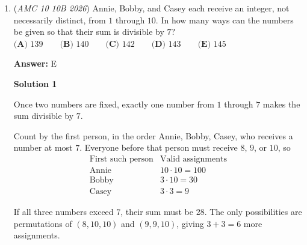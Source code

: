 \begin{enumerate}
 
Case 2: Ben goes first

 Note how the $r$ value would stay the same, because the same thing needs to happen -- Ben fails his $n$th draw, and Anika fails her $n + 1$th draw, so $r = \dfrac{6}{25}$. However, this time, the probability Ben wins immediately or $a$ is $\dfrac{2}{5}$. Using the infinite geometric series, we get that $B = \dfrac{10}{19}$Lastly, $B - A = \dfrac{10}{19} - \dfrac{4}{19} = \boxed{\dfrac{6}{19}} = \boxed{D}$ 

 -- aditya.a

 \textbf{Similar Problems} \href{https://artofproblemsolving.com/wiki/index.php?title=1981\_AHSME\_Problems/Problem\_26}{1981 AHSME \#26}

 \href{https://artofproblemsolving.com/wiki/index.php?title=2015\_AMC\_12B\_Problems/Problem\_9}{2015 AMC 12B \#9}

 \href{https://artofproblemsolving.com/wiki/index.php?title=2017\_AMC\_10A\_Problems/Problem\_18}{2017 AMC 10A \#18}

 


	\item (\textit{AMC 10 10B 2026}) Annie, Bobby, and Casey each receive an integer, not necessarily distinct, from $1$ through $10.$ In how many ways can the numbers be given so that their sum is divisible by $7?$
$\textbf{(A) } 139 \qquad \textbf{(B) } 140 \qquad \textbf{(C) } 142 \qquad \textbf{(D) } 143 \qquad \textbf{(E) } 145$

 \textbf{Answer: }E



\textbf{Solution 1}

Once two numbers are fixed, exactly one number from $1$ through $7$ makes the sum divisible by $7$.

 Count by the first person, in the order Annie, Bobby, Casey, who receives a number at most $7$. Everyone before that person must receive $8$, $9$, or $10$, so
 \[\begin{array}{c|c} \text{First such person}&\text{Valid assignments}\\ \hline \text{Annie}&10\cdot10=100\\ \text{Bobby}&3\cdot10=30\\ \text{Casey}&3\cdot3=9 \end{array}\]

 If all three numbers exceed $7$, their sum must be $28$. The only possibilities are permutations of $(8,10,10)$ and $(9,9,10)$, giving $3+3=6$ more assignments.


\end{enumerate}
